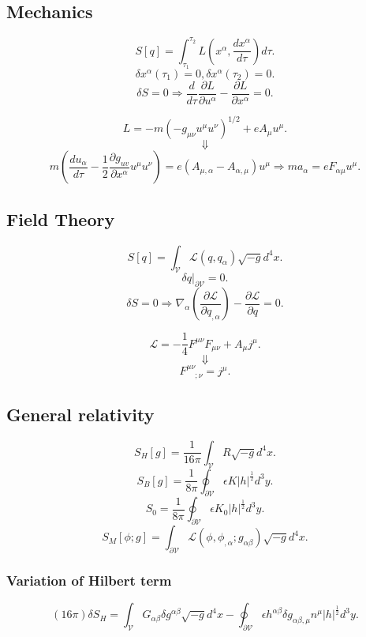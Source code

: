 \subsection{Mechanics}
\[S[q] = \int_{\tau_1}^{\tau_2} L(x^{\alpha},\frac{dx^{\alpha}}{d\tau}) d\tau.\]
\[\delta x^{\alpha}(\tau_1)=0, \delta x^{\alpha}(\tau_2)=0.\]
\[\delta S = 0 \Rightarrow \frac{d}{d\tau} \frac{\partial L}{\partial u^{\alpha}} - \frac{\partial L}{\partial x^{\alpha}}=0.\]
\begin{example}
\[L = -m(-g_{\mu\nu} u^{\mu} u^{\nu})^{1/2} + e A_{\mu} u^{\mu}.\]
\[\Downarrow\]
\[m(\frac{du_{\alpha}}{d\tau} - \frac{1}{2} \frac{\partial g_{uv}}{\partial x^{\alpha}} u^{\mu} u^{\nu}) = e(A_{\mu,\alpha}-A_{\alpha,\mu})u^{\mu} \Rightarrow ma_{\alpha} = eF_{\alpha\mu} u^{\mu} .\]
\end{example}

\subsection{Field Theory}
\[S[q] = \int_{\mathcal{V}} \mathcal{L}(q,q_{\alpha})\sqrt{-g} d^4x.\]
\[\delta q|_{\partial \mathcal{V}} = 0.\]
\[\delta S = 0 \Rightarrow \nabla_{\alpha} (\frac{\partial \mathcal{L}}{\partial q_{,\alpha}}) - \frac{\partial \mathcal{L}}{\partial q} = 0.\]
\begin{example}
\[\mathcal{L} = -\frac{1}{4} F^{\mu \nu} F_{\mu \nu} + A_{\mu} j^{\mu}.\]
\[\Downarrow\]
\[F^{\mu \nu}_{\phantom{\mu \nu} ;\nu} = j^{\mu}.\]
\end{example}

\subsection{General relativity}
\[S_{H}[g] = \frac{1}{16\pi} \int_{\mathcal{V}} R \sqrt{-g} d^4 x.\]
\[S_{B}[g] = \frac{1}{8 \pi} \oint_{\partial \mathcal{V}} \epsilon K |h|^{\frac{1}{2}} d^3 y.\]
\[S_0 = \frac{1}{8\pi} \oint_{\partial \mathcal{V}} \epsilon K_0 |h|^{\frac{1}{2}} d^3 y.\]
\[S_M[\phi;g] = \int_{\partial \mathcal{V}} \mathcal{L}(\phi,\phi_{,\alpha};g_{\alpha \beta}) \sqrt{-g} d^4 x.\]
\subsubsection{Variation of Hilbert term}
\[(16 \pi) \delta S_H = \int_{\mathcal{V}} G_{\alpha \beta} \delta g^{\alpha \beta} \sqrt{-g} d^4 x - \oint_{\partial \mathcal{V}} \epsilon h^{\alpha \beta} \delta g_{\alpha \beta, \mu} n^{\mu} |h|^{\frac{1}{2}} d^3 y.\]
